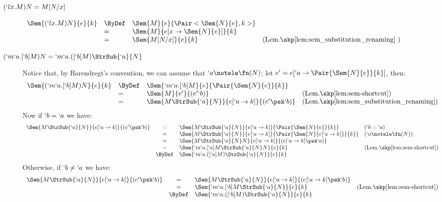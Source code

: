 \documentclass{CSML}
\begin{document}
 \begin{description}

 \item [$ {(`lx.M)N = M[N/x] } $] 
$ \begin{array}[t]{lll@{\quad}l}
 \Sem{ (`lx.M)N }{ e }{ k } 
	&\ByDef& 
 \Sem{ M }{ e }{ \Pair< \Sem{ N }{ e } , k >} \\
	&=& 
 \Sem{ M }{ e[x \to \Sem{ N }{ e }] }{ k } \\
	&=& 
 \Sem{ M[N/x] }{ e }{ k } & (\textrm{Lem.\skp\ref{lem:sem_substitution_renaming} }) 
 \end{array} $

 \item [{$(`m`a.[`b]M)N = `m`a.([`b]M) \StrSub{`a} {N} $}] 
Notice that, by Barendregt's convention, we can assume that $`a \notele \fn(N)$; let $e' = e[`a \to \Pair{\Sem{ N }{ e } }{ k }]$, then:
%
 \[ \begin{array}[t]{lll@{\quad}l}
 \Sem{ (`m`a.[`b]M)N }{ e }{ k } 
	&\ByDef& \Sem{ `m`a.[`b]M }{ e }{ \Pair{\Sem{ N }{ e } }{ k } } \\
	&=& \Sem{ M }{ e' }{ (e' `b) } & (\textrm{Lem.\skp\ref{lem:sem-shortcut}}) \\
	&=& \Sem{ M\StrSub{`a}{N} }{ e[`a\to k] }{ (e' \psk `b) } 
& (\textrm{Lem.\skp\ref{lem:sem_substitution_renaming}} ) 
 \end{array} \]
Now if $`b = `a$ we have:
%
 \[ \begin{array}{rcl@{\quad}l}
 \Sem{ M\StrSub{`a}{N} }{ e[`a\to k] }{ (e' \psk `b) } 
	& = & \Sem{ M\StrSub{`a}{N} }{ e[`a\to k] }{ \Pair{\Sem{ N }{ e } }{ k } } & (`b = `a) \\
	& = & \Sem{ M\StrSub{`a}{N} }{ e[`a\to k] }{ \Pair{\Sem{ N }{ e [`a\to k] } }{ k } } & (`a\notele \fn(N)) \\
	& = & \Sem{ M\StrSub{`a}{N}N }{ e[`a\to k] }{ (e[`a\to k]\psk`a) } \\
	& = & \Sem{ `m`a.[`a]M\StrSub{`a}{N} N }{ e }{ k } & (\textrm{Lem.\skp\ref{lem:sem-shortcut}}) \\
	&\ByDef& \Sem{ `m`a.([`a]M) \StrSub{`a} {N} }{ e }{ k }
 \end{array} \]
%
Otherwise, if $`b \neq `a$ we have:
%
 \[ \begin{array}{rcl@{\quad}l}
 \Sem{ M\StrSub{`a}{N} }{ e[`a\to k] }{ (e' \psk `b) } 
	& = & \Sem{ M\StrSub{`a}{N} }{ e[`a\to k] }{ (e[`a \to k] \psk `b) } \\
	& = & \Sem{ `m`a.[`b]M \StrSub{`a}{N} }{ e }{ k } & (\textrm{Lem.\skp\ref{lem:sem-shortcut}}) \\
	&\ByDef& \Sem{ `m`a.([`b]M) \StrSub{`a} {N} }{ e }{ k } 
 \end{array} \]


\end{description}
\end{document}
